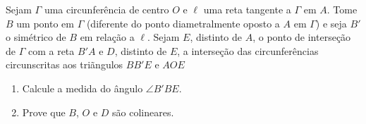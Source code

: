 Sejam $\Gamma$ uma circunferência de centro $O$ e $\ell$ uma reta tangente a $\Gamma$ em $A$. Tome $B$ um ponto em $\Gamma$ (diferente do ponto diametralmente oposto a $A$ em $\Gamma$) e seja $B'$ o simétrico de $B$ em relação a $\ell$. Sejam $E$, distinto de $A$, o ponto de interseção de $\Gamma$ com a reta $B'A$ e $D$, distinto de $E$, a interseção das circunferências circunscritas aos triãngulos $BB'E$ e $AOE$

\begin{enumerate}[label = (\alph*)]
	\item Calcule a medida do ângulo $\angle B'BE$.
	\item Prove que $B$, $O$ e $D$ são colineares.
\end{enumerate}
